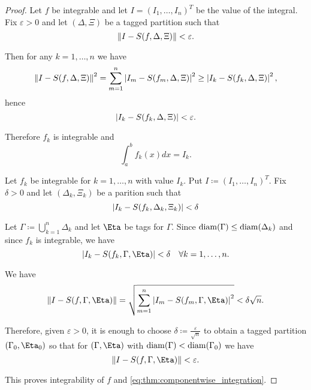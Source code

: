 \begin{proof}
  \Sufficiency Let \( f \) be integrable and let \( I = (I_1, \ldots, I_n)^T \) be the value of the integral. Fix \( \varepsilon > 0 \) and let \( (\Delta, \Xi) \) be a tagged partition such that
  \begin{equation*}
    \left\Vert I - S(f, \Delta, \Xi) \right\Vert < \varepsilon.
  \end{equation*}

  Then for any \( k = 1, \ldots, n \) we have
  \begin{equation*}
    \left\Vert I - S(f, \Delta, \Xi) \right\Vert^2
    =
    \sum_{m=1}^n \left\vert I_m - S(f_m, \Delta, \Xi) \right\vert^2
    \geq
    \left\vert I_k - S(f_k, \Delta, \Xi) \right\vert^2,
  \end{equation*}
  hence
  \begin{equation*}
    \left\vert I_k - S(f_k, \Delta, \Xi) \right\vert < \varepsilon.
  \end{equation*}

  Therefore \( f_k \) is integrable and
  \begin{equation*}
    \int_a^b f_k(x) dx = I_k.
  \end{equation*}

  \Necessity Let \( f_k \) be integrable for \( k = 1, \ldots, n \) with value \( I_k \). Put \( I \coloneqq (I_1, \ldots, I_n)^T \). Fix \( \delta > 0 \) and let \( (\Delta_k, \Xi_k) \) be a parition such that
  \begin{equation*}
    \left\vert I_k - S(f_k, \Delta_k, \Xi_k) \right\vert < \delta
  \end{equation*}

  Let \( \Gamma \coloneqq \bigcup_{k=1}^n \Delta_k \) and let \( \Eta \) be tags for \( \Gamma \). Since \( \operatorname{diam}(\Gamma) \leq \operatorname{diam}(\Delta_k) \) and since \( f_k \) is integrable, we have
  \begin{equation*}
    \Abs{I_k - S(f_k, \Gamma, \Eta)} < \delta \quad\forall k = 1, \ldots, n.
  \end{equation*}

  We have
  \begin{equation*}
    \Norm{I - S(f, \Gamma, \Eta)}
    =
    \sqrt{\sum_{m=1}^n \Abs{I_m - S(f_m, \Gamma, \Eta)}^2}
    <
    \delta \sqrt{n}.
  \end{equation*}

  Therefore, given \( \varepsilon > 0 \), it is enough to choose \( \delta \coloneqq \frac {\varepsilon} {\sqrt n} \) to obtain a tagged partition \( (\Gamma_0, \Eta_0) \) so that for \( (\Gamma, \Eta) \) with \( \operatorname{diam}(\Gamma) < \operatorname{diam}(\Gamma_0) \) we have
  \begin{equation*}
    \Norm{I - S(f, \Gamma, \Eta)} < \varepsilon.
  \end{equation*}

  This proves integrability of \( f \) and \eqref{eq:thm:componentwise_integration}.
\end{proof}
